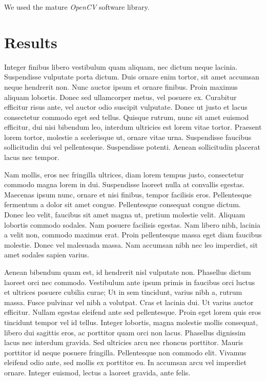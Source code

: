 \documentclass{ltjarticle}
\begin{document}
We used the mature \emph{OpenCV} software library.\cite{opencv_library} 

\section{Results}

Integer finibus libero vestibulum quam aliquam, nec dictum neque lacinia. Suspendisse vulputate porta dictum. Duis ornare enim tortor, sit amet accumsan neque hendrerit non. Nunc auctor ipsum et ornare finibus. Proin maximus aliquam lobortis. Donec sed ullamcorper metus, vel posuere ex. Curabitur efficitur risus ante, vel auctor odio suscipit vulputate. Donec ut justo et lacus consectetur commodo eget sed tellus. Quisque rutrum, nunc sit amet euismod efficitur, dui nisi bibendum leo, interdum ultricies est lorem vitae tortor. Praesent lorem tortor, molestie a scelerisque ut, ornare vitae urna. Suspendisse faucibus sollicitudin dui vel pellentesque. Suspendisse potenti. Aenean sollicitudin placerat lacus nec tempor.

Nam mollis, eros nec fringilla ultrices, diam lorem tempus justo, consectetur commodo magna lorem in dui. Suspendisse laoreet nulla at convallis egestas. Maecenas ipsum nunc, ornare et nisi finibus, tempor facilisis eros. Pellentesque fermentum a dolor sit amet congue. Pellentesque consequat congue dictum. Donec leo velit, faucibus sit amet magna ut, pretium molestie velit. Aliquam lobortis commodo sodales. Nam posuere facilisis egestas. Nam libero nibh, lacinia a velit non, commodo maximus erat. Proin pellentesque massa eget diam faucibus molestie. Donec vel malesuada massa. Nam accumsan nibh nec leo imperdiet, sit amet sodales sapien varius.

Aenean bibendum quam est, id hendrerit nisl vulputate non. Phasellus dictum laoreet orci nec commodo. Vestibulum ante ipsum primis in faucibus orci luctus et ultrices posuere cubilia curae; Ut in sem tincidunt, varius nibh a, rutrum massa. Fusce pulvinar vel nibh a volutpat. Cras et lacinia dui. Ut varius auctor efficitur. Nullam egestas eleifend ante sed pellentesque. Proin eget lorem quis eros tincidunt tempor vel id tellus. Integer lobortis, magna molestie mollis consequat, libero dui sagittis eros, ac porttitor quam orci non lacus. Phasellus dignissim lacus nec interdum gravida. Sed ultricies arcu nec rhoncus porttitor. Mauris porttitor id neque posuere fringilla. Pellentesque non commodo elit. Vivamus eleifend odio ante, sed mollis ex porttitor eu. In accumsan arcu vel imperdiet ornare. Integer euismod, lectus a laoreet gravida, ante felis. 
\end{document}
